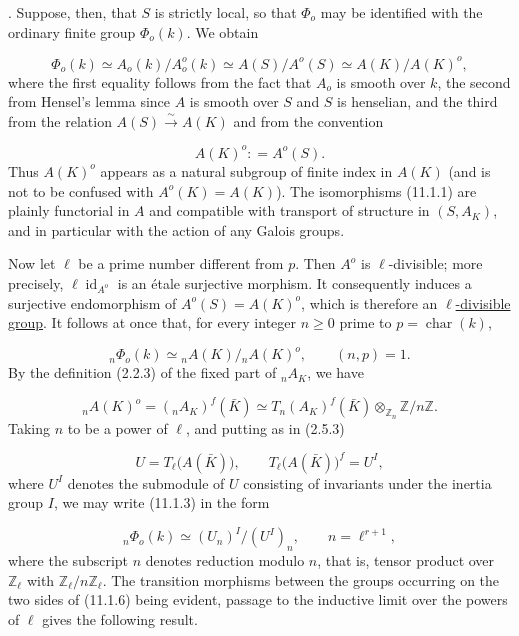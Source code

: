 \smallskip
{}. Suppose, then, that $S$ is strictly local, so that $\Phi_o$ may be
identified with the ordinary finite group $\Phi_o(k)$. We obtain

\begin{equation}\tag{11.1.1}
\Phi_o(k)\simeq A_o(k)/A_o^o(k)
 \simeq A(S)/A^o(S)
 \simeq A(K)/A(K)^o,
\end{equation}
where the first equality follows from the fact that $A_o$ is smooth over
$k$, the second from Hensel's lemma since $A$ is smooth over $S$ and
$S$ is henselian, and the third from the relation
$A(S)\xrightarrow{\sim}A(K)$ and from the convention

\begin{equation}\tag{11.1.2}
A(K)^o\mathrel{\mathop:}=A^o(S).
\end{equation}
Thus $A(K)^o$ appears as a natural subgroup of finite index in $A(K)$
(and is not to be confused with $A^o(K)=A(K)$). The isomorphisms
(11.1.1) are plainly functorial in $A$ and compatible with transport of
structure in $(S,A_K)$, and in particular with the action of any Galois
groups.

Now let $\ell$ be a prime number different from $p$. Then $A^o$ is
$\ell$-divisible; more precisely, $\ell\operatorname{id}_{A^o}$ is an
\'etale surjective morphism. It consequently induces a surjective
endomorphism of $A^o(S)=A(K)^o$, which is therefore an
\underline{$\ell$-divisible group}. It follows at once that, for every
integer $n\geq 0$ prime to $p=\operatorname{char}(k)$,

\begin{equation}\tag{11.1.3}
{}_n\Phi_o(k)\simeq{}_nA(K)/{}_nA(K)^o,
 \qquad (n,p)=1.
\end{equation}
By the definition (2.2.3) of the fixed part of ${}_nA_K$, we have

\begin{equation}\tag{11.1.4}
{}_nA(K)^o=({}_nA_K)^f(\bar K)
 \simeq T_n(A_K)^f(\bar K)
 \otimes_{\mathbb Z_n}\mathbb Z/n\mathbb Z.
\end{equation}
Taking $n$ to be a power of $\ell$, and putting as in (2.5.3)

\begin{equation}\tag{11.1.5}
U=T_\ell\bigl(A(\bar K)\bigr),
 \qquad
T_\ell\bigl(A(\bar K)\bigr)^f=U^I,
\end{equation}
where $U^I$ denotes the submodule of $U$ consisting of invariants under
the inertia group $I$, we may write (11.1.3) in the form

\begin{equation}\tag{11.1.6}
{}_n\Phi_o(k)\simeq (U_n)^I/(U^I)_n,
 \qquad n=\ell^{r+1},
\end{equation}
where the subscript $n$ denotes reduction modulo $n$, that is, tensor
product over $\mathbb Z_\ell$ with
$\mathbb Z_\ell/n\mathbb Z_\ell$. The transition morphisms between the
groups occurring on the two sides of (11.1.6) being evident, passage to
the inductive limit over the powers of $\ell$ gives the following
result.


